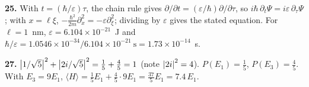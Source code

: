 \textbf{25.} With $t=(\hbar/\varepsilon)\tau$, the chain rule gives $\partial/\partial t=(\varepsilon/\hbar)\partial/\partial\tau$, so $i\hbar\,\partial_t\Psi=i\varepsilon\,\partial_\tau\Psi$; with $x=\ell\xi$, $-\frac{\hbar^2}{2m}\partial_x^2=-\varepsilon\partial_\xi^2$; dividing by $\varepsilon$ gives the stated equation. For $\ell=1$~nm, $\varepsilon=6.104\times10^{-21}$~J and $\hbar/\varepsilon=1.0546\times10^{-34}/6.104\times10^{-21}~\text{s}=1.73\times10^{-14}$~s.

\textbf{27.} $\left\lvert 1/\sqrt5\right\rvert^2+\left\lvert 2i/\sqrt5\right\rvert^2=\frac15+\frac45=1$ (note $\left\lvert 2i\right\rvert^2=4$). $P(E_1)=\frac15$, $P(E_3)=\frac45$. With $E_3=9E_1$, $\langle H\rangle=\frac15E_1+\frac45\cdot9E_1=\frac{37}5E_1=7.4\,E_1$.
